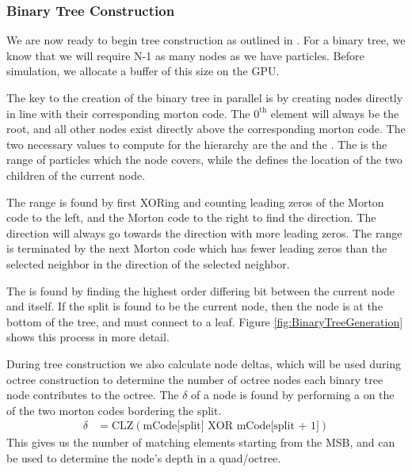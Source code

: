 \documentclass{thesis}
\begin{document}
\subsubsection{Binary Tree Construction}
We are now ready to begin tree construction as outlined in \cite{Karas:2012}. For a binary tree, we know that we will require N-1 as many nodes as we have particles. Before simulation, we allocate a buffer of this size on the GPU.

The key to the creation of the binary tree in parallel is by creating nodes directly in line with their corresponding morton code. The $\text{0}^\text{th}$ element will always be the root, and all other nodes exist directly above the corresponding morton code. The two necessary values to compute for the hierarchy are the  and the . The  is the range of particles which the node covers, while the  defines the location of the two children of the current node. 

The range is found by first XORing and counting leading zeros of the Morton code to the left, and the Morton code to the right to find the direction. The direction will always go towards the direction with more leading zeros. The range is terminated by the next Morton code which has fewer leading zeros than the selected neighbor in the direction of the selected neighbor. 

The  is found by finding the highest order differing bit between the current node and itself. If the split is found to be the current node, then the node is at the bottom of the tree, and must connect to a leaf. Figure \ref{fig:BinaryTreeGeneration} shows this process in more detail.

During tree construction we also calculate node deltas, which will be used during octree construction to determine the number of octree nodes each binary tree node contributes to the octree. The $\delta$ of a node is found by performing a  on the  of the two morton codes bordering the split.
\begin{align}
    \delta &= \text{CLZ}(\text{mCode[split]} \text{ XOR } \text{mCode[split + 1]})
\end{align}
This gives us the number of matching elements starting from the MSB, and can be used to determine the node's depth in a quad/octree.

\end{document}
